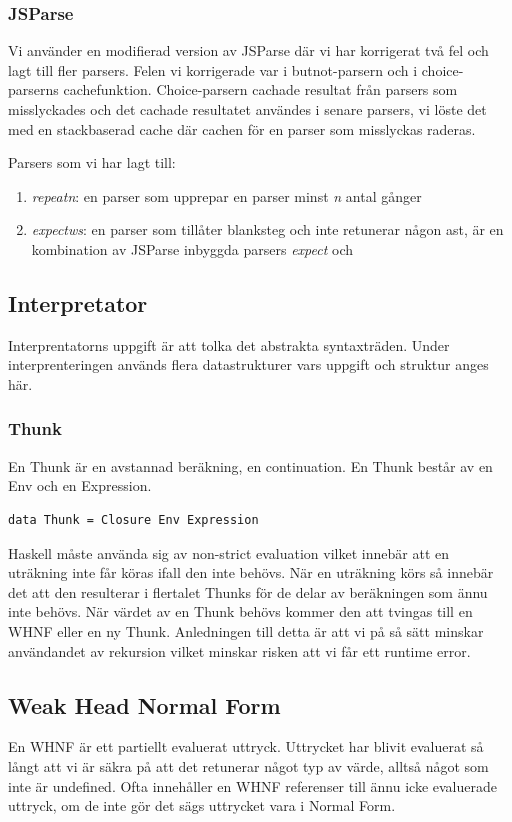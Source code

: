 \subsubsection{JSParse}
Vi använder en modifierad version av JSParse där vi har korrigerat två fel och lagt till fler parsers. Felen vi korrigerade var i butnot-parsern och i choice-parserns cachefunktion. 
Choice-parsern cachade resultat från parsers som misslyckades och det cachade resultatet användes i senare parsers, 
vi löste det med en stackbaserad cache där cachen för en parser som misslyckas raderas.

Parsers som vi har lagt till:
\begin{enumerate}
    \item{\emph{repeatn}: en parser som upprepar en parser minst \emph{n} antal gånger}
    \item{\emph{expectws}: en parser som tillåter blanksteg och inte retunerar någon ast, är en kombination av JSParse inbyggda parsers \emph{expect} och }
\end{enumerate}



\subsection{Interpretator}
Interprentatorns uppgift är att tolka det abstrakta syntaxträden. Under interprenteringen används flera datastrukturer vars uppgift och struktur anges här.

\subsubsection{Thunk}
En Thunk är en avstannad beräkning, en continuation. En Thunk består av en Env och en Expression.

\begin{lstlisting}
data Thunk = Closure Env Expression
\end{lstlisting}

Haskell måste använda sig av non-strict evaluation vilket innebär att en uträkning inte får köras ifall den inte behövs. När en uträkning körs så innebär det att den resulterar i flertalet Thunks för de delar av beräkningen som ännu inte behövs. När värdet av en Thunk behövs kommer den att tvingas till en WHNF eller en ny Thunk. Anledningen till detta är att vi på så sätt minskar användandet av rekursion vilket minskar risken att vi får ett runtime error.

\subsection{Weak Head Normal Form}
En WHNF är ett partiellt evaluerat uttryck. Uttrycket har blivit evaluerat så långt att vi är säkra på att det retunerar något typ av värde, alltså något som inte är undefined. Ofta innehåller en WHNF referenser till ännu icke evaluerade uttryck, om de inte gör det sägs uttrycket vara i Normal Form.

